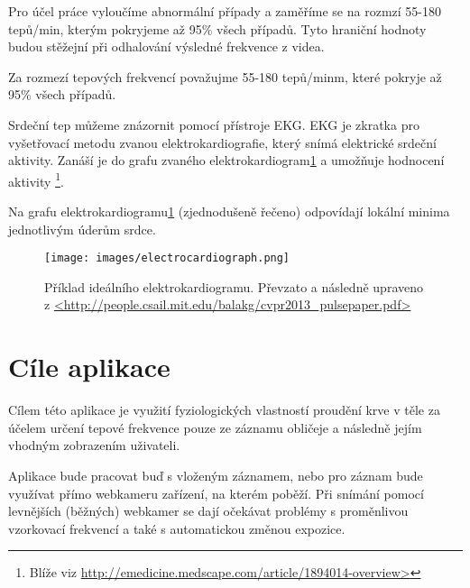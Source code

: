 \documentclass[
  digital, %
  table,   %
%
  lof,     %
  lot,     %
]{fithesis3}
\begin{document}
Pro účel práce vyloučíme abnormální případy a zaměříme se na rozmzí 55-180 tepů/min, kterým pokryjeme až
95\% všech případů. Tyto hraniční hodnoty budou stěžejní při odhalování výsledné frekvence z videa.

\begin{center}
	Za rozmezí tepových frekvencí považujme 55-180 tepů/minm, které pokryje až 95\% všech případů.
    \label{freq-range}
\end{center}

Srdeční tep můžeme znázornit pomocí přístroje EKG. EKG je zkratka pro vyšetřovací metodu zvanou elektrokardiografie, který snímá elektrické srdeční aktivity. Zanáší je do grafu zvaného elektrokardiogram\ref{fig:electrocardiograph} a umožňuje hodnocení aktivity
\footnote{Blíže viz \url{http://emedicine.medscape.com/article/1894014-overview>}}.

Na grafu elektrokardiogramu\ref{fig:electrocardiograph} (zjednodušeně řečeno) odpovídají lokální minima jednotlivým úderům srdce.

\begin{figure}
  \begin{center}
    \texttt{[image: images/electrocardiograph.png]}
  \end{center}
  \caption{Příklad ideálního elektrokardiogramu. Převzato a následně upraveno z \url{<http://people.csail.mit.edu/balakg/cvpr2013_pulsepaper.pdf>}}
  \label{fig:electrocardiograph}
\end{figure}


\section{Cíle aplikace}
Cílem této aplikace je využití fyziologických vlastností proudění krve v těle za účelem určení tepové frekvence pouze ze záznamu obličeje a následně jejím vhodným zobrazením uživateli.

Aplikace bude pracovat buď s vloženým záznamem, nebo pro záznam bude využívat přímo webkameru zařízení, na kterém poběží. Při snímání pomocí levnějších (běžných) webkamer se dají očekávat problémy s proměnlivou vzorkovací frekvencí a také s automatickou změnou expozice.
\end{document}
